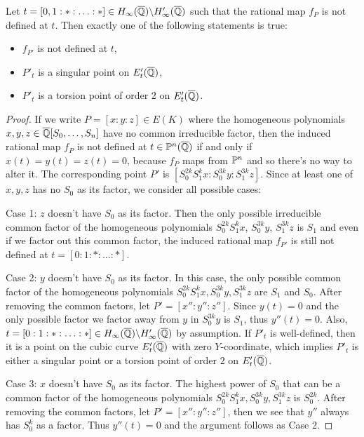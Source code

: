 \documentclass[12pt,reqno]{amsart}
\begin{document}
\begin{lemma} \label{PL} Let $t=[0,1:*:\ldots:*] \in H_\infty(\overline{\mathbb{Q}}) \backslash H'_\infty(\overline{\mathbb{Q}})$ such that the rational map $f_P$ is not defined at $t$. Then exactly one of the following statements is true:
\begin{itemize}
\item[a)] $f_{P'}$ is not defined at $t$,
\item[b)] $P'_t$ is a singular point on  $E'_t(\overline{\mathbb{Q}})$,
\item[c)] $P'_t$ is a torsion point of order $2$ on $E'_t(\overline{\mathbb{Q}})$.
\end{itemize}
\end{lemma}
\begin{proof} If we write $P=[x:y:z] \in E(K)$ where the homogeneous polynomials $x,y,z \in \overline{\mathbb{Q}}[S_0, \ldots, S_n]$ have no common irreducible factor, then the induced rational map $f_P$ is not defined at $t \in \mathbb{P}^n(\overline{\mathbb{Q}})$ if and only if $x(t)=y(t)=z(t)=0$, because $f_P$ maps from $\mathbb{P}^n$ and so there's no way to alter it. The corresponding point $P'$ is $[S_0^{2k}S_1^kx: S_0^{3k}y: S_1^{3k}z]$. Since at least one of $x,y,z$ has no $S_0$ as its factor, we consider all possible cases:

Case 1: $z$ doesn't have $S_0$ as its factor. Then the only possible irreducible common factor of the homogeneous polynomials $S_0^{2k}S_1^kx$, $S_0^{3k}y$, $S_1^{3k}z$ is $S_1$ and even if we factor out this common factor, the induced rational map $f_{P'}$ is still not defined at $t=[0:1:*:\ldots:*]$.  

Case 2: $y$  doesn't have $S_0$ as its factor. In this case, the only possible common factor of the homogeneous polynomials $S_0^{2k}S_1^kx, S_0^{3k}y, S_1^{3k}z$ are $S_1$ and $S_0$. After removing the common factors, let $P'=[x'':y'':z'']$. Since $y(t)=0$ and the only possible factor we factor away from $y$ in $ S_0^{3k}y$ is $S_1$, thus $y''(t)=0$. Also, $t=[0:1:*:\ldots:*] \in H_\infty(\overline{\mathbb{Q}}) \backslash H'_\infty(\overline{\mathbb{Q}})$ by assumption. If $P'_t$ is well-defined, then it is a point on the cubic curve $E_t'(\overline{\mathbb{Q}})$ with zero $Y$-coordinate, which implies $P'_t$ is either a singular point or a torsion point of order $2$ on $E'_t(\overline{\mathbb{Q}})$.

Case 3: $x$  doesn't have $S_0$ as its factor. The highest power of $S_0$ that can be a common factor of the homogeneous polynomials $S_0^{2k}S_1^kx, S_0^{3k}y, S_1^{3k}z$ is $S_0^{2k}$.  After removing the common factors, let $P'=[x'':y'':z'']$, then we see that $y''$ always has $S_0^k$ as a factor. Thus $y''(t)=0$ and the argument follows as Case 2. 
\end{proof}
\end{document}
